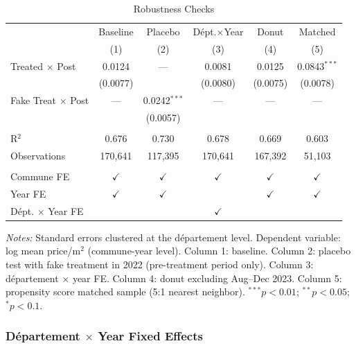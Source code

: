 \documentclass[12pt]{article}
\begin{document}
\begin{table}[htbp]
    \centering
    \caption{Robustness Checks}
    \label{tab:robustness_table}
    \begin{threeparttable}
    \begin{tabular}{lccccc}
    \toprule
    & Baseline & Placebo & D\'ept.$\times$Year & Donut & Matched \\
    & (1) & (2) & (3) & (4) & (5) \\
    \midrule
    Treated $\times$ Post & 0.0124 & --- & 0.0081 & 0.0125 & 0.0843$^{***}$ \\
    & (0.0077) & & (0.0080) & (0.0075) & (0.0078) \\
    Fake Treat $\times$ Post & --- & 0.0242$^{***}$ & --- & --- & --- \\
    & & (0.0057) & & & \\
    \\
    R$^2$ & 0.676 & 0.730 & 0.678 & 0.669 & 0.603 \\
    Observations & 170,641 & 117,395 & 170,641 & 167,392 & 51,103 \\
    \\
    Commune FE & $\checkmark$ & $\checkmark$ & $\checkmark$ & $\checkmark$ & $\checkmark$ \\
    Year FE & $\checkmark$ & $\checkmark$ & & $\checkmark$ & $\checkmark$ \\
    D\'ept. $\times$ Year FE & & & $\checkmark$ & & \\
    \bottomrule
    \end{tabular}
    \begin{tablenotes}[flushleft]\small
    \item \textit{Notes:} Standard errors clustered at the d\'epartement level. Dependent variable: log mean price/m$^2$ (commune-year level). Column 1: baseline. Column 2: placebo test with fake treatment in 2022 (pre-treatment period only). Column 3: d\'epartement $\times$ year FE. Column 4: donut excluding Aug--Dec 2023. Column 5: propensity score matched sample (5:1 nearest neighbor). $^{***}p<0.01$; $^{**}p<0.05$; $^{*}p<0.1$.
    \end{tablenotes}
    \end{threeparttable}
\end{table}

\subsubsection{D\'epartement $\times$ Year Fixed Effects}
\end{document}

